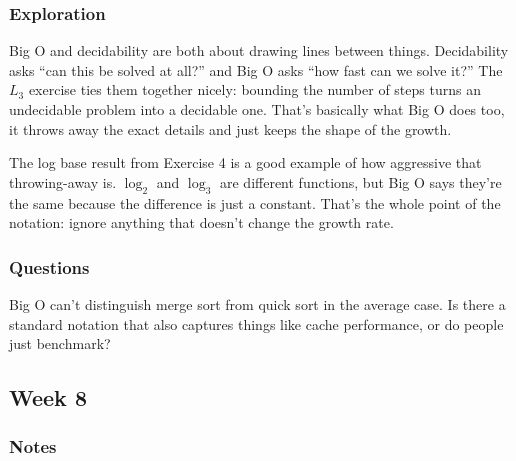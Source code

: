 \documentclass{article}
\theoremstyle{theorem}
\theoremstyle{definition}
\theoremstyle{remark}
\begin{document}
\subsubsection{Exploration}

Big O and decidability are both about drawing lines between things. Decidability asks ``can this be solved at all?'' and Big O asks ``how fast can we solve it?'' The $L_3$ exercise ties them together nicely: bounding the number of steps turns an undecidable problem into a decidable one. That's basically what Big O does too, it throws away the exact details and just keeps the shape of the growth.

The log base result from Exercise 4 is a good example of how aggressive that throwing-away is. $\log_2$ and $\log_3$ are different functions, but Big O says they're the same because the difference is just a constant. That's the whole point of the notation: ignore anything that doesn't change the growth rate.

\subsubsection{Questions}

Big O can't distinguish merge sort from quick sort in the average case. Is there a standard notation that also captures things like cache performance, or do people just benchmark?






































\subsection{Week 8}

\subsubsection{Notes}
\end{document}
